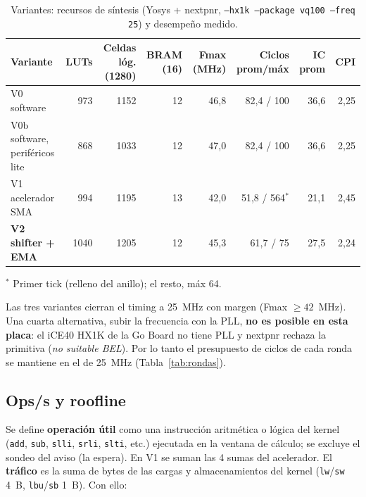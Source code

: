 \documentclass[11pt,letterpaper]{article}
\renewcommand{\_}{\textunderscore\allowbreak}
\begin{document}
\begin{table}[H]\centering\small
\caption{Variantes: recursos de síntesis (Yosys + nextpnr, \texttt{--hx1k --package vq100 --freq 25}) y desempeño medido.}\label{tab:hw}
\begin{tabularx}{\linewidth}{lrrrrrrr}\toprule
Variante & LUTs & Celdas lóg. (1280) & BRAM (16) & Fmax (MHz) & Ciclos prom/máx & IC prom & CPI\\\midrule
V0 software & 973 & 1152 & 12 & 46,8 & 82,4 / 100 & 36,6 & 2,25\\
V0b software, periféricos lite & 868 & 1033 & 12 & 47,0 & 82,4 / 100 & 36,6 & 2,25\\
V1 acelerador SMA & 994 & 1195 & 13 & 42,0 & 51,8 / 564$^{*}$ & 21,1 & 2,45\\
\textbf{V2 shifter + EMA} & 1040 & 1205 & 12 & 45,3 & 61,7 / 75 & 27,5 & 2,24\\\bottomrule
\end{tabularx}
\par\footnotesize $^{*}$ Primer tick (relleno del anillo); el resto, máx 64.
\end{table}
Las tres variantes cierran el timing a 25~MHz con margen (Fmax $\ge 42$~MHz). Una cuarta alternativa, subir la frecuencia con la PLL, \textbf{no es posible en esta placa}: el iCE40 HX1K de la Go Board no tiene PLL y nextpnr rechaza la primitiva (\emph{no suitable BEL}). Por lo tanto el presupuesto de ciclos de cada ronda se mantiene en el de 25~MHz (Tabla~\ref{tab:rondas}).

\subsection{Ops/s y roofline}
Se define \textbf{operación útil} como una instrucción aritmética o lógica del kernel (\texttt{add}, \texttt{sub}, \texttt{slli}, \texttt{srli}, \texttt{slti}, etc.) ejecutada en la ventana de cálculo; se excluye el sondeo del aviso (la espera). En V1 se suman las 4 sumas del acelerador. El \textbf{tráfico} es la suma de bytes de las cargas y almacenamientos del kernel (\texttt{lw}/\texttt{sw} 4~B, \texttt{lbu}/\texttt{sb} 1~B). Con ello:
\end{document}
